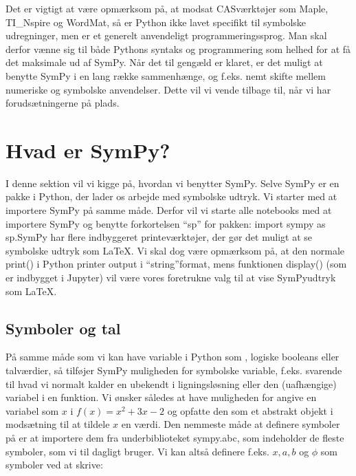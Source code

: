 \documentclass[letterpaper,10pt,english]{jupyterBook}
\begin{document}
Det er vigtigt at være opmærksom på, at modsat CAS\sphinxhyphen{}værktøjer som Maple, TI\_Nspire og WordMat, så er Python ikke lavet specifikt til symbolske udregninger, men er et generelt anvendeligt programmeringssprog. Man skal derfor vænne sig til både Pythons syntaks og programmering som helhed for at få det maksimale ud af SymPy. Når det til gengæld er klaret, er det muligt at benytte SymPy i en lang række sammenhænge, og f.eks. nemt skifte mellem numeriske og symbolske anvendelser. Dette vil vi vende tilbage til, når vi har forudsætningerne på plads.


\section{Hvad er SymPy?}
\label{\detokenize{notebooks/sympy/Notebook2:hvad-er-sympy}}\label{\detokenize{notebooks/sympy/Notebook2::doc}}
I denne sektion vil vi kigge på, hvordan vi benytter SymPy. Selve SymPy er en pakke i Python, der lader os arbejde med symbolske udtryk. Vi starter med at importere SymPy på samme måde. Derfor vil vi starte alle notebooks med at importere SymPy og benytte forkortelsen “sp” for pakken: import sympy as sp.SymPy har flere indbyggeret printe\sphinxhyphen{}værktøjer, der gør det muligt at se symbolske udtryk som LaTeX. Vi skal dog være opmærksom på, at den normale print() i Python printer output i “string”\sphinxhyphen{}format, mens funktionen display() (som er indbygget i Jupyter) vil være vores foretrukne valg til at vise SymPy\sphinxhyphen{}udtryk som LaTeX. 

\begin{sphinxVerbatim}[commandchars=\\\{\}]
                       
\end{sphinxVerbatim}


\subsection{Symboler og tal}
\label{\detokenize{notebooks/sympy/Notebook2:symboler-og-tal}}
På samme måde som vi kan have variable i Python som , logiske booleans eller talværdier, så tilføjer SymPy muligheden for symbolske variable, f.eks. svarende til hvad vi normalt kalder en ubekendt i ligningsløsning eller den (uafhængige) variabel i en funktion. Vi ønsker således at have muligheden for angive en variabel som \(x\) i \(f(x) = x^2+3x-2\) og opfatte den som et abstrakt objekt i modsætning til at tildele \(x\) en værdi. Den nemmeste måde at definere symboler på er at importere dem fra underbiblioteket sympy.abc, som indeholder de fleste symboler, som vi til dagligt bruger. Vi kan altså definere f.eks. \(x, a, b\) og \(\phi\) som symboler ved at skrive:
\end{document}
